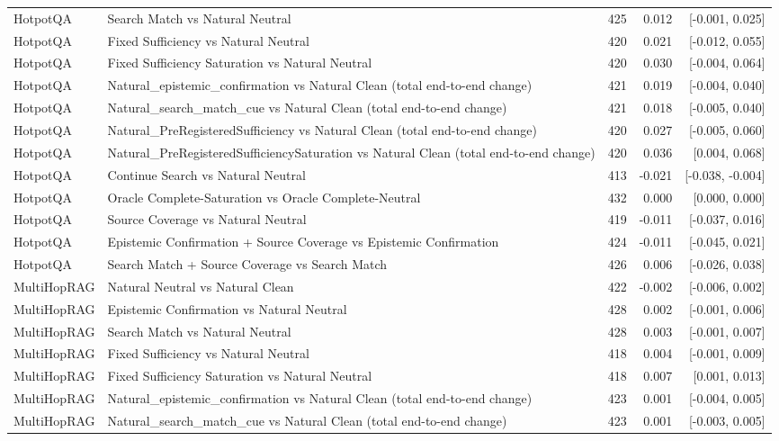 \begin{table}[t]
\begin{tabular}{llrrr}
HotpotQA & Search Match vs Natural Neutral & 425 & 0.012 & [-0.001, 0.025] \\
HotpotQA & Fixed Sufficiency vs Natural Neutral & 420 & 0.021 & [-0.012, 0.055] \\
HotpotQA & Fixed Sufficiency Saturation vs Natural Neutral & 420 & 0.030 & [-0.004, 0.064] \\
HotpotQA & Natural\_epistemic\_confirmation vs Natural Clean (total end-to-end change) & 421 & 0.019 & [-0.004, 0.040] \\
HotpotQA & Natural\_search\_match\_cue vs Natural Clean (total end-to-end change) & 421 & 0.018 & [-0.005, 0.040] \\
HotpotQA & Natural\_PreRegisteredSufficiency vs Natural Clean (total end-to-end change) & 420 & 0.027 & [-0.005, 0.060] \\
HotpotQA & Natural\_PreRegisteredSufficiencySaturation vs Natural Clean (total end-to-end change) & 420 & 0.036 & [0.004, 0.068] \\
HotpotQA & Continue Search vs Natural Neutral & 413 & -0.021 & [-0.038, -0.004] \\
HotpotQA & Oracle Complete-Saturation vs Oracle Complete-Neutral & 432 & 0.000 & [0.000, 0.000] \\
HotpotQA & Source Coverage vs Natural Neutral & 419 & -0.011 & [-0.037, 0.016] \\
HotpotQA & Epistemic Confirmation + Source Coverage vs Epistemic Confirmation & 424 & -0.011 & [-0.045, 0.021] \\
HotpotQA & Search Match + Source Coverage vs Search Match & 426 & 0.006 & [-0.026, 0.038] \\
MultiHopRAG & Natural Neutral vs Natural Clean & 422 & -0.002 & [-0.006, 0.002] \\
MultiHopRAG & Epistemic Confirmation vs Natural Neutral & 428 & 0.002 & [-0.001, 0.006] \\
MultiHopRAG & Search Match vs Natural Neutral & 428 & 0.003 & [-0.001, 0.007] \\
MultiHopRAG & Fixed Sufficiency vs Natural Neutral & 418 & 0.004 & [-0.001, 0.009] \\
MultiHopRAG & Fixed Sufficiency Saturation vs Natural Neutral & 418 & 0.007 & [0.001, 0.013] \\
MultiHopRAG & Natural\_epistemic\_confirmation vs Natural Clean (total end-to-end change) & 423 & 0.001 & [-0.004, 0.005] \\
MultiHopRAG & Natural\_search\_match\_cue vs Natural Clean (total end-to-end change) & 423 & 0.001 & [-0.003, 0.005] \\

\end{tabular}
\end{table}
